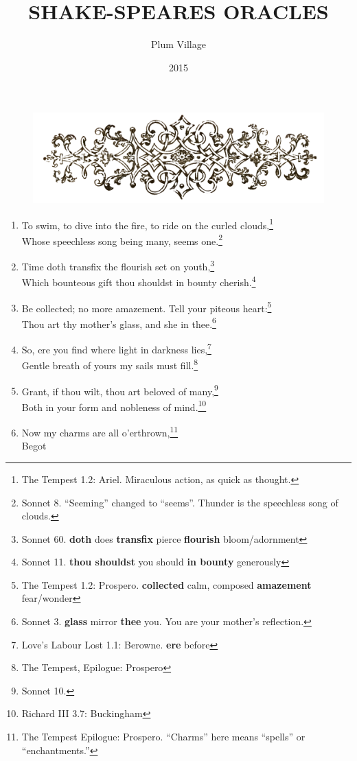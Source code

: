 \documentclass[17pt,twoside]{extarticle}
\title{SHAKE-SPEARES ORACLES}
\author{Plum Village}
\date{2015}
\begin{document}
\begin{figure}[htbp]
     \centering
     \includegraphics[width=15.5cm]{images/frontispiece.png}
\end{figure}

\begin{enumerate}
\item
  To swim, to dive into the fire, to ride on the curled
  clouds,\footnote{The Tempest 1.2: Ariel. Miraculous action, as quick
    as thought.}\\Whose speechless song being many, seems one.\footnote{Sonnet
    8. ``Seeming'' changed to ``seems''. Thunder is the speechless song
    of clouds.}
\item
  Time doth transfix the flourish set on youth,\footnote{Sonnet 60.
    \textbf{doth} does \textbf{transfix} pierce \textbf{flourish}
    bloom/adornment}\\Which bounteous gift thou shouldst in bounty
  cherish.\footnote{Sonnet 11. \textbf{thou shouldst} you should
    \textbf{in bounty} generously}
\item
  Be collected; no more amazement. Tell your piteous heart:\footnote{The
    Tempest 1.2: Prospero. \textbf{collected} calm, composed
    \textbf{amazement} fear/wonder}\\Thou art thy mother's glass, and
  she in thee.\footnote{Sonnet 3. \textbf{glass} mirror \textbf{thee}
    you. You are your mother's reflection.}
\item
  So, ere you find where light in darkness lies,\footnote{Love's Labour
    Lost 1.1: Berowne. \textbf{ere} before}\\Gentle breath of yours my
  sails must fill.\footnote{The Tempest, Epilogue: Prospero}
\item
  Grant, if thou wilt, thou art beloved of many,\footnote{Sonnet 10.}\\Both
  in your form and nobleness of mind.\footnote{Richard III 3.7:
    Buckingham}
\item
  Now my charms are all o'erthrown,\footnote{The Tempest Epilogue:
    Prospero. ``Charms'' here means ``spells'' or ``enchantments.''}\\Begot

\end{enumerate}
\end{document}
